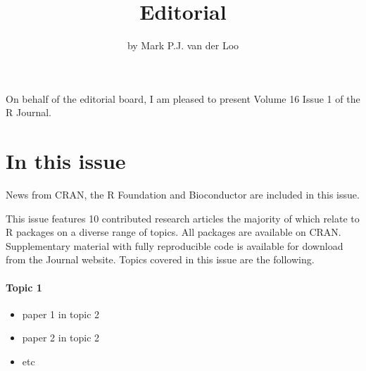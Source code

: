 \title{Editorial}


\author{by Mark P.J. van der Loo}

\maketitle


On behalf of the editorial board, I am pleased to present Volume 16 Issue 1 of
the R Journal.

\section*{In this issue}\label{in-this-issue}

News from CRAN, the R Foundation and Bioconductor are included in this issue.

\noindent This issue features 10 contributed research articles the majority of
which relate to R packages on a diverse range of topics. All packages are
available on CRAN. Supplementary material with fully reproducible code is
available for download from the Journal website. Topics covered in this issue
are the following.

\paragraph{Topic 1}\label{topic-1}

\begin{itemize}
\tightlist
\item
  paper 1 in topic 2
\item
  paper 2 in topic 2
\item
  etc
\end{itemize}


\address{%
Mark P.J. van der Loo\\
Statistics Netherlands and Leiden University\\%
\\
%
\url{https://journal.r-project.org}\\%
%
\href{mailto:r-journal@r-project.org}{\nolinkurl{r-journal@r-project.org}}%
}
